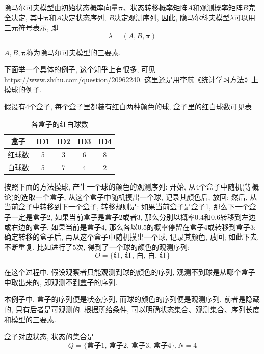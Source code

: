 \documentclass[a4paper,UTF8]{ctexart}
\theoremstyle{plain} \newtheorem{theorem}{定理}[section]
\theoremstyle{plain} \newtheorem{definition}{定义}[section]
\theoremstyle{plain} \newtheorem{lemma}{引理}[section]
\theoremstyle{plain} \newtheorem{proposition}{命题}[section]
\theoremstyle{plain} \newtheorem{example}{例}[section]
\theoremstyle{plain} \newtheorem{remark}{注}[section]
\theoremstyle{plain} \newtheorem{corollary}{推论}[section]
\begin{document}
隐马尔可夫模型由初始状态概率向量$\bm{\pi}$、状态转移概率矩阵$A$和观测概率矩阵$B$完全决定, 其中$\bm{\pi}$和$A$决定状态序列, $B$决定观测序列, 因此, 隐马尔科夫模型$\lambda$可以用三元符号表示, 即
\begin{equation*}
\lambda = (A, B, \bm{\pi})
\end{equation*}

$A, B, \bm{\pi}$称为隐马尔可夫模型的三要素.

下面举一个具体的例子, 这个知乎上有很多, 可见\url{https://www.zhihu.com/question/20962240}. 这里还是用李航《统计学习方法》上摸球的例子.

假设有$4$个盒子, 每个盒子里都装有红白两种颜色的球, 盒子里的红白球数可见表
\begin{table}[!htb]
\centering
\caption{各盒子的红白球数}
\label{box}
\begin{tabular}{ccccc}
  \hline
    \textbf{盒子} & \textbf{ID1} & \textbf{ID2} & \textbf{ID3} & \textbf{ID4} \\
    \hline
    红球数   &  5  &  3  & 6 & 8 \\
    \hline
    白球数   &  5  &  7  & 4 & 2 \\
  \hline
\end{tabular}
\end{table}

按照下面的方法摸球, 产生一个球的颜色的观测序列: 开始, 从$4$个盒子中随机(等概论)的选取一个盒子, 从这个盒子中随机摸出一个球, 记录其颜色后, 放回; 然后, 从当前盒子中转移到下一个盒子, 转移规则是: 如果当前盒子是盒子1, 那么下一个盒子一定是盒子2, 如果当前盒子是盒子2或者3, 那么分别以概率$0.4$和$0.6$转移到左边或右边的盒子, 如果当前是盒子4, 那么各以$0.5$的概率停留在盒子4或转移到盒子3; 确定转移的盒子后, 再从这个盒子中随机摸出一个球, 记录其颜色, 放回; 如此下去, 不断重复. 比如进行了$5$次, 得到了一个球的颜色的观测序列:
\begin{equation*}
O = \{\textrm{红, 红, 白, 白, 红}\}
\end{equation*}

在这个过程中, 假设观察者只能观测到球的颜色的序列, 观测不到球是从哪个盒子中取出来的, 即观测不到盒子的序列.

本例子中, 盒子的序列便是状态序列, 而球的颜色的序列便是观测序列, 前者是隐藏的, 只有后者是可观测的. 根据所给条件, 可以明确状态集合、观测集合、序列长度和模型的三要素.

盒子对应状态, 状态的集合是
\begin{equation*}
Q = \{\textrm{盒子1, 盒子2, 盒子3, 盒子4}\}, N = 4
\end{equation*}
\end{document}
